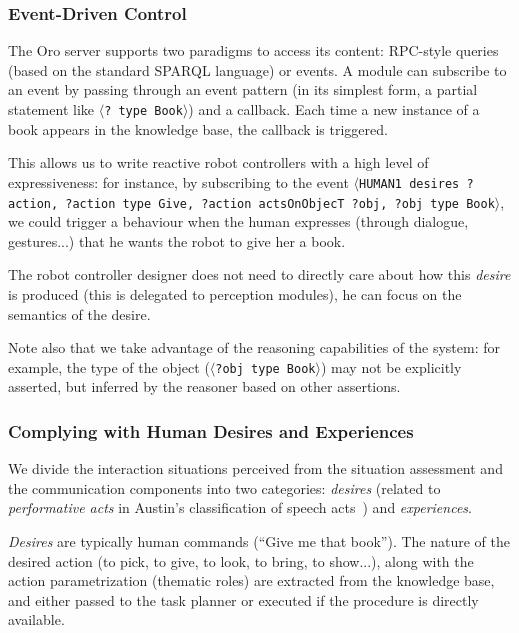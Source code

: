 \documentclass[preprint,3p,times]{elsarticle}
\newcommand{\stmt}[1]{{\footnotesize\tt$\langle$#1\relax$\rangle$}}
\begin{document}
\subsubsection{Event-Driven Control}
\label{events}

The {\sc Oro} server supports two paradigms to access its content: RPC-style
queries (based on the standard SPARQL language) or events. A module can
subscribe to an event by passing through an event pattern (in its simplest
form, a partial statement like \stmt{? type Book}) and a callback.  Each
time a new instance of a book appears in the knowledge base, the callback is
triggered.

This allows us to write reactive robot controllers with a high level of
expressiveness: for instance, by subscribing to the event \stmt{HUMAN1 desires
?action, ?action type Give, ?action actsOnObjecT ?obj, ?obj type Book}, we could
trigger a behaviour when the human expresses (through dialogue, gestures...)
that he wants the robot to give her a book.

The robot controller designer does not need to directly care about how this
\emph{desire} is produced (this is delegated to perception modules), he can
focus on the semantics of the desire.

Note also that we take advantage of the reasoning capabilities of the system:
for example, the type of the object (\stmt{?obj type Book}) may not be
explicitly asserted, but inferred by the reasoner based on other assertions.

\subsubsection{Complying with Human Desires and Experiences}
\label{sect:desires}

We divide the interaction situations perceived from the situation assessment and
the communication components into two categories: \emph{desires} (related to
\emph{performative acts} in Austin's classification of speech
acts~\cite{Austin1962}) and \emph{experiences}.

\emph{Desires} are typically human commands (``Give me that book''). The nature of
the desired action (to pick, to give, to look, to bring, to show...), along with the action
parametrization (thematic roles) are extracted from the knowledge base, and
either passed to the task planner or executed if the procedure is directly
available.
\end{document}
